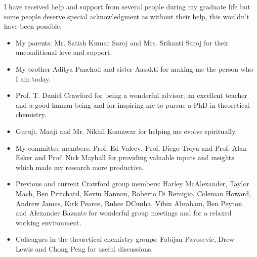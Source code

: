 I have received help and support from several people during my graduate life but
some people deserve special acknowledgment as without their help, this wouldn't have
been possible.
\begin{itemize}
\item {My parents: Mr. Satish Kumar Saroj and Mrs. Srikanti Saroj for their unconditional love and support.}
\item {My brother Aditya Pancholi and sister Aasakti for making me the person who I am today.}
\item {Prof. T. Daniel Crawford for being a wonderful advisor, an excellent teacher and a good human-being and for inspiring me to pursue a PhD in theoretical chemistry.}
\item {Guruji, Maaji and Mr. Nikhil Komawar for helping me evolve spiritually.}
\item {My committee members: Prof. Ed Valeev, Prof. Diego Troya and Prof. Alan Esker and Prof. Nick Mayhall for providing
valuable inputs and insights which made my research more productive.}
\item{Previous and current Crawford group members: Harley McAlexander, Taylor Mach, Ben Pritchard, Kevin Hannon, Roberto Di Remigio, 
Coleman Howard, Andrew James, Kirk Pearce, Ruhee DCunha, Vibin Abraham, Ben Peyton and Alexander Bazante for wonderful group meetings and for a relaxed working environment.}
\item {Colleagues in the theoretical chemistry groups: Fabijan Pavosevic, Drew Lewis and Chong Peng for useful discussions.}
\end{itemize}
